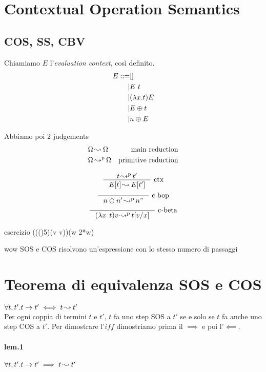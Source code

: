 \documentclass{article}
\newcommand{\rl}[3]{\inference{#1}{#2}\text{ #3}}
\newcommand{\bop}[0]{\ensuremath\oplus}
\begin{document}
\section{Contextual Operation Semantics}
\subsection{COS, SS, CBV}
Chiamiamo $E$ l'\textit{evaluation context}, così definito.
\begin{align*}
E ::= &[] \\
|& E\ t \\
|& (\lambda x.t)E \\
|& E \oplus t \\
|& n \bop E 
\end{align*}

Abbiamo poi 2 judgements
\begin{align*}
    \Omega &\operatorname{ \leadsto^{} } \Omega & \text{main reduction} \\
    \Omega &\operatorname{ \leadsto^{p} } \Omega & \text{primitive reduction}
\end{align*}

\begin{gather*}
    \rl{t\credp t'}{E[t]\cred E[t']}{ctx} \\
    \rl{}{n\bop n' \credp n"}{c-bop} \\
    \rl{}{(\lam{x}{t})v \credp t[v/x]}{c-beta}
\end{gather*}

\begin{callout}{esercizio}
((()5)(\lam v v))(\lam w {2*w})
\end{callout}

\begin{callout}{wow}
SOS e COS risolvono un'espressione con lo stesso numero di passaggi
\end{callout}

\section{Teorema di equivalenza SOS e COS}
$\forall t,t'.t\to t' \iff t\operatorname{ \leadsto^{} } t'$ \\
Per ogni coppia di termini $t$ e $t'$, $t$ fa uno step SOS a $t'$ se e solo se $t$ fa anche uno step COS a $t'$.
Per dimostrare l'$iff$ dimostriamo prima il $\implies$ e poi l'$\impliedby$.

\paragraph{lem.1} $\forall t,t'.t\to t' \implies t\operatorname{ \leadsto^{} } t'$
\end{document}
